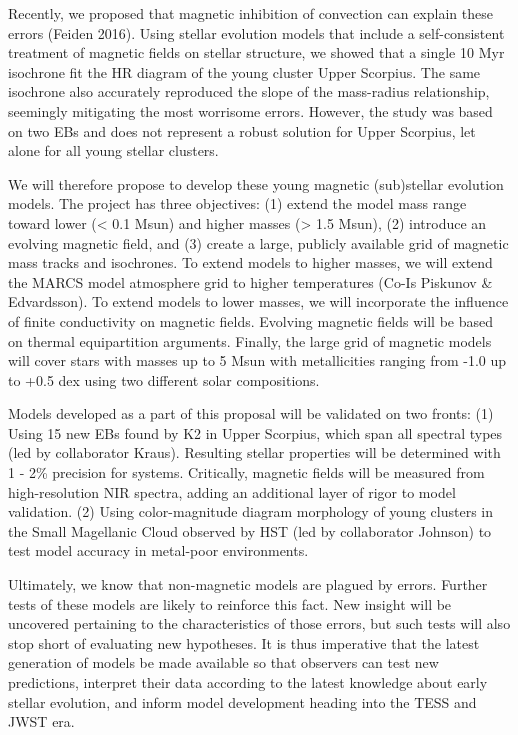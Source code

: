 \documentclass[12pt,letter]{article}
\begin{document}
Recently, we proposed that magnetic inhibition of convection can explain these errors (Feiden 2016). Using stellar evolution models that include a self-consistent treatment of magnetic fields on stellar structure, we showed that a single 10 Myr isochrone fit the HR diagram of the young cluster Upper Scorpius. The same isochrone also accurately reproduced the slope of the mass-radius relationship, seemingly mitigating the most worrisome errors. However, the study was based on two EBs and does  not represent a robust solution for Upper Scorpius, let alone for all young stellar clusters.

We will therefore propose to develop these young magnetic (sub)stellar evolution models. The project has three objectives: (1) extend the model mass range toward lower (< 0.1 Msun) and higher masses (> 1.5 Msun), (2) introduce an evolving magnetic field, and (3) create a large, publicly available grid of magnetic mass tracks and isochrones. To extend models to higher masses, we will extend the MARCS model atmosphere grid to higher temperatures (Co-Is Piskunov \& Edvardsson). To extend models to lower masses, we will incorporate the influence of finite conductivity on magnetic fields. Evolving magnetic fields will be based on thermal equipartition arguments. Finally, the large grid of magnetic models will cover stars with masses up to 5 Msun with metallicities ranging from -1.0 up to +0.5 dex using two different solar compositions. 

Models developed as a part of this proposal will be validated on two fronts: (1) Using 15 new EBs found by K2 in Upper Scorpius, which span all spectral types (led by collaborator Kraus). Resulting stellar properties will be determined with 1 - 2\% precision for systems. Critically, magnetic fields will be measured from high-resolution NIR spectra, adding an additional layer of rigor to model validation. (2) Using color-magnitude diagram morphology of young clusters in the Small Magellanic Cloud observed by HST (led by collaborator Johnson) to test model accuracy in metal-poor environments.

Ultimately, we know that non-magnetic models are plagued by errors. Further tests of these models are likely to reinforce this fact. New insight will be uncovered pertaining to the characteristics of those errors, but such tests will also stop short of evaluating new hypotheses. It is thus imperative that the latest generation of models be made available so that observers can test new predictions, interpret their data according to the latest knowledge about early stellar evolution, and inform model development heading into the TESS and JWST era.
\end{document}
